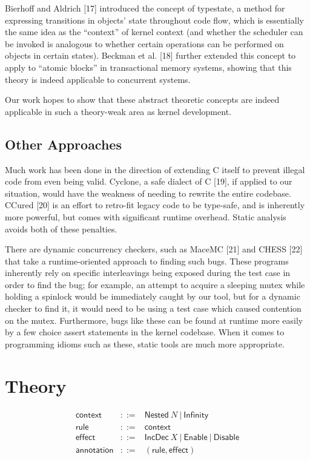 \documentclass{article}
\begin{document}
Bierhoff and Aldrich [17] introduced the concept of typestate, a method for expressing transitions in objects' state throughout code flow, which is essentially the same idea as the ``context'' of kernel context (and whether the scheduler can be invoked is analogous to whether certain operations can be performed on objects in certain states). Beckman et al. [18] further extended this concept to apply to ``atomic blocks'' in transactional memory systems, showing that this theory is indeed applicable to concurrent systems.

Our work hopes to show that these abstract theoretic concepts are indeed applicable in such a theory-weak area as kernel development.

\subsection{Other Approaches}

Much work has been done in the direction of extending C itself to prevent illegal code from even being valid. Cyclone, a safe dialect of C [19], if applied to our situation, would have the weakness of needing to rewrite the entire codebase. CCured [20] is an effort to retro-fit legacy code to be type-safe, and is inherently more powerful, but comes with significant runtime overhead. Static analysis avoids both of these penalties.

There are dynamic concurrency checkers, such as MaceMC [21] and CHESS [22] that take a runtime-oriented approach to finding such bugs. These programs inherently rely on specific interleavings being exposed during the test case in order to find the bug; for example, an attempt to acquire a sleeping mutex while holding a spinlock would be immediately caught by our tool, but for a dynamic checker to find it, it would need to be using a test case which caused contention on the mutex. Furthermore, bugs like these can be found at runtime more easily by a few choice assert statements in the kernel codebase. When it comes to programming idioms such as these, static tools are much more appropriate.


\section{Theory}

\begin{eqnarray*}
	\mathsf{context} & ::= & \mathsf{Nested}~ N ~|~ \mathsf{Infinity} \\
	\mathsf{rule} & ::= & \mathsf{context} \\
	\mathsf{effect} & ::= & \mathsf{IncDec}~ X ~|~ \mathsf{Enable} ~|~ \mathsf{Disable} \\
	\mathsf{annotation} & ::= & (\mathsf{rule},\mathsf{effect}) \\
\end{eqnarray*}
\end{document}
